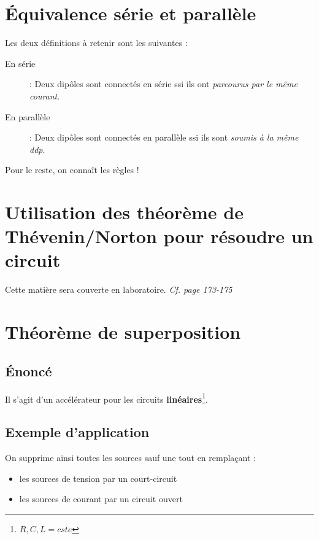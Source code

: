 \documentclass[11pt, a4paper, openany]{book}
\begin{document}
		\setcounter{section}{4}
		\section{Équivalence série et parallèle}
		Les deux définitions à retenir sont les suivantes :
		\begin{description}
			\item[En série] : Deux dipôles sont connectés en série ssi ils ont \textit{parcourus par le même courant}.
			\item[En parallèle] : Deux dipôles sont connectés en parallèle ssi ils sont \textit{soumis à la même ddp}.
		\end{description}
		Pour le reste, on connaît les règles !
		
		\section{Utilisation des théorème de Thévenin/Norton pour résoudre un circuit}
		Cette matière sera couverte en laboratoire. \textit{Cf. page 173-175}
		
		\setcounter{section}{7}
		\section{Théorème de superposition}
		\subsection{Énoncé}
		Il s'agit d'un accélérateur pour les circuits \textbf{linéaires}\footnote{$R, C, L = cste$}.\\
		
		
		\subsection{Exemple d'application}
		On supprime ainsi toutes les sources sauf une tout en remplaçant :
		\begin{itemize}
			\item les sources de tension par un court-circuit
			\item les sources de courant par un circuit ouvert
		\end{itemize}
		
\end{document}
